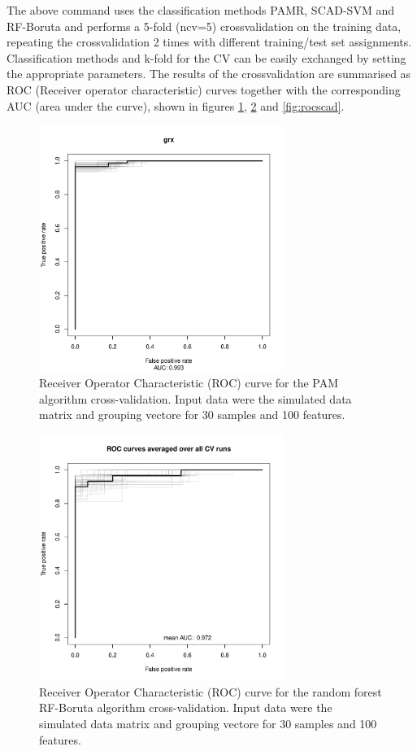 \documentclass[11pt,a4paper]{article}
\begin{document}
The above command uses the classification methods PAMR, SCAD-SVM and RF-Boruta and performs a 5-fold (ncv=5) crossvalidation on the training data, repeating the crossvalidation 2 times with different training/test set assignments. Classification methods and k-fold for the CV can be easily exchanged by setting the appropriate parameters. The results of the crossvalidation are summarised as ROC (Receiver operator characteristic) curves together with the corresponding AUC (area under the curve), shown in figures \ref{fig:rocpam}, \ref{fig:rocrf} and \ref{fig:rocscad}.

\begin{figure}[htp]
\centering
\includegraphics[width=8cm,height=8cm]{rocpam}
\caption{Receiver Operator Characteristic (ROC) curve for the PAM algorithm cross-validation. Input data were the simulated data matrix and grouping vectore for 30 samples and 100 features.}
\label{fig:rocpam}
\end{figure}

\begin{figure}[htp]
\centering
\includegraphics[width=8cm,height=8cm]{rocrf}
\caption{Receiver Operator Characteristic (ROC) curve for the random forest RF-Boruta algorithm cross-validation. Input data were the simulated data matrix and grouping vectore for 30 samples and 100 features.}
\label{fig:rocrf}
\end{figure}
\end{document}
